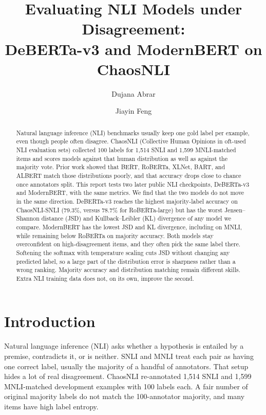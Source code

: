 \documentclass[11pt,a4paper]{article}
\title{\vspace{-1.2em}Evaluating NLI Models under Disagreement:\\
DeBERTa-v3 and ModernBERT on ChaosNLI\vspace{-0.4em}}
\author{Dujana Abrar \and Jiayin Feng}
\date{}
\begin{document}
\maketitle
\vspace{-1.2em}

\begin{abstract}
Natural language inference (NLI) benchmarks usually keep one gold label per example, even though people often disagree. ChaosNLI (Collective Human Opinions in oft-used NLI evaluation sets) collected 100 labels for 1,514 SNLI and 1,599 MNLI-matched items and scores models against that human distribution as well as against the majority vote. Prior work showed that BERT, RoBERTa, XLNet, BART, and ALBERT match those distributions poorly, and that accuracy drops close to chance once annotators split. This report tests two later public NLI checkpoints, DeBERTa-v3 and ModernBERT, with the same metrics. We find that the two models do not move in the same direction. DeBERTa-v3 reaches the highest majority-label accuracy on ChaosNLI-SNLI (79.3\%, versus 78.7\% for RoBERTa-large) but has the worst Jensen--Shannon distance (JSD) and Kullback--Leibler (KL) divergence of any model we compare. ModernBERT has the lowest JSD and KL divergence, including on MNLI, while remaining below RoBERTa on majority accuracy. Both models stay overconfident on high-disagreement items, and they often pick the same label there. Softening the softmax with temperature scaling cuts JSD without changing any predicted label, so a large part of the distribution error is sharpness rather than a wrong ranking. Majority accuracy and distribution matching remain different skills. Extra NLI training data does not, on its own, improve the second.
\end{abstract}

\section{Introduction}

Natural language inference (NLI) asks whether a hypothesis is entailed by a premise, contradicts it, or is neither. SNLI \cite{bowman2015snli} and MNLI \cite{williams2018mnli} treat each pair as having one correct label, usually the majority of a handful of annotators. That setup hides a lot of real disagreement. ChaosNLI \cite{nie2020chaosnli} re-annotated 1,514 SNLI and 1,599 MNLI-matched development examples with 100 labels each. A fair number of original majority labels do not match the 100-annotator majority, and many items have high label entropy.
\end{document}
